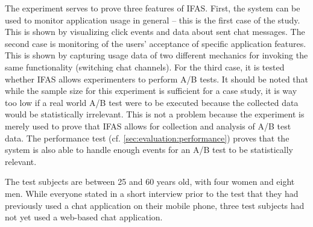 

The experiment serves to prove three features of \ac{IFAS}.
First, the system can be used to monitor application usage in general -- this is the first case of the study.
This is shown by visualizing click events and data about sent chat messages.
The second case is monitoring of the users' acceptance of specific application features.
This is shown by capturing usage data of two different mechanics for invoking the same functionality (switching chat channels).
For the third case, it is tested whether \ac{IFAS} allows experimenters to perform A/B tests.
It should be noted that while the sample size for this experiment is sufficient for a case study, it is way too low if a real world A/B test were to be executed because the collected data would be statistically irrelevant.
This is not a problem because the experiment is merely used to prove that \ac{IFAS} allows for collection and analysis of A/B test data.
The performance test (cf. \cref{sec:evaluation:performance}) proves that the system is also able to handle enough events for an A/B test to be statistically relevant.

%

The test subjects are between 25 and 60 years old, with four women and eight men.
While everyone stated in a short interview prior to the test that they had previously used a chat application on their mobile phone, three test subjects had not yet used a web-based chat application.

